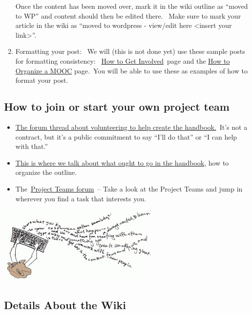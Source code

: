 \begin{enumerate}
  Once the content has been moved over, mark it in the wiki outline as
  ``moved to WP'' and content should then be edited there.~ Make sure to
  mark your article in the wiki as ``moved to wordpress - view/edit here
  \textless{}insert your link\textgreater{}''.
\item
  Formatting your post:~ We will (this is not done yet) use these sample
  posts for formatting consistency:
  ~\href{http://peeragogy.org/how-to-get-involved/}{How to Get
  Involved}~page and the
  \href{http://peeragogy.org/connectivism-in-practice-how-to-organize-a-mooc/}{How
  to Organize a MOOC} page.~You will be able to use these as examples of
  how to format your post.
\end{enumerate}

\subsection{How to join or start your own project team}

\begin{itemize}
\item
  \href{http://socialmediaclassroom.com/host/peeragogy/forum/teaming-signing-flesh-out-parts-outline}{The
  forum thread about volunteering to help create the handbook.}~It's not
  a contract, but it's a public commitment to say ``I'll do that'' or
  ``I can help with that.''
\item
  \href{http://socialmediaclassroom.com/host/peeragogy/forum/initial-rough-outline}{This
  is where we talk about what ought to go in the handbook}, how to
  organize the outline.
\item
  The~\href{http://socialmediaclassroom.com/host/peeragogy/forums/project-teams}{Project
  Teams forum}~-- Take a look at the Project Teams and jump in wherever
  you find a task that interests you.
\end{itemize}

\href{http://peeragogy.org/wp-content/uploads/2012/03/create\_content.gif}{\includegraphics{./pictures/create_content.jpg}}

\subsection{Details About the Wiki}

